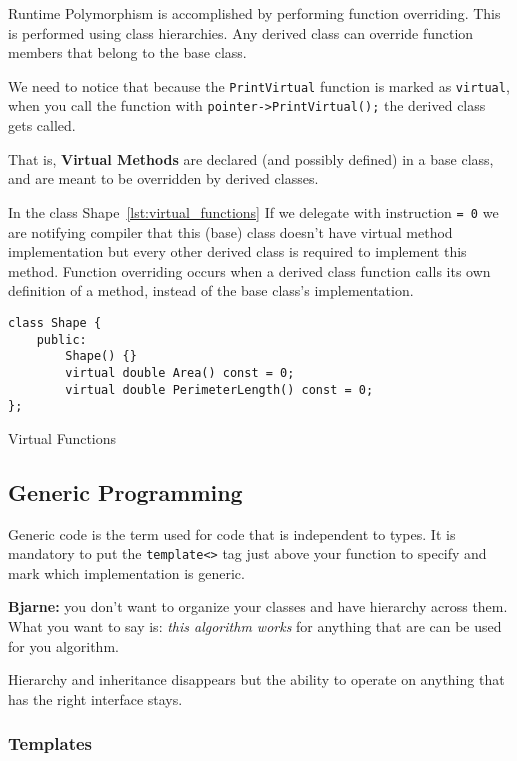 \documentclass[11pt, a4paper]{article}
\begin{document}
Runtime Polymorphism is accomplished by performing function overriding. This is performed using class hierarchies. Any derived class can override function members that belong to the base class.

We need to notice that because the \texttt{PrintVirtual} function is marked as \texttt{virtual}, when you call the function with \texttt{pointer->PrintVirtual();} the derived class gets called.

That is, \textbf{Virtual Methods} are declared (and possibly defined) in a base class, and are meant to be overridden by derived classes.


In the class Shape~\ref{lst:virtual_functions} If we delegate with instruction \texttt{= 0} we are notifying compiler that this (base) class doesn't have virtual method implementation but every other derived class is required to implement this method.
Function overriding occurs when a derived class function calls its own definition of a method, instead of the base class's implementation. 

\begin{listing}
\begin{verbatim}
class Shape {
	public:
		Shape() {}
		virtual double Area() const = 0;
		virtual double PerimeterLength() const = 0;
};
\end{verbatim}
\caption{Virtual Functions}
\label{lst:virtual_functions}
\end{listing}




\subsection{Generic Programming}%
\label{ssub:generic_programming}

Generic code is the term used for code that is independent to types. It is mandatory to put the \texttt{template<>} tag just above your function to specify and mark which implementation is generic.


\textbf{Bjarne:} you don't want to organize your classes and have hierarchy across them. What you want to say is: \textit{this algorithm works} for anything that are can be used for you algorithm. 


Hierarchy and inheritance disappears but the ability to operate on anything that has the right interface stays. 

\subsubsection{Templates}%
\label{ssub:templates}
\end{document}
